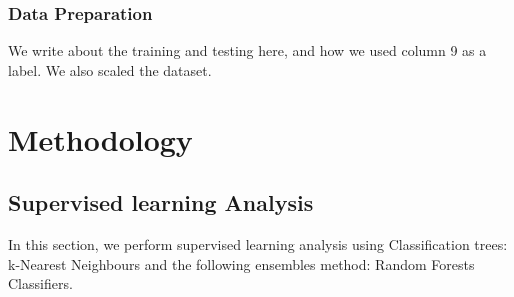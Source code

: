 \documentclass[12pt]{article}
\begin{document}
\begin{enumerate}
		
		
		
		
		
	
	
	
		
		
		
		
		
	
	
	
		
		
		
		
		
		
\end{enumerate}
 

\subsubsection{Data Preparation} 

We write about the training and testing here, and how we used column 9 as a label. We also scaled the dataset.\\

\section{Methodology}
\subsection{Supervised learning Analysis} 
 In this section, we perform supervised learning analysis using Classification trees: k-Nearest Neighbours and the following ensembles method: Random Forests Classifiers.\cite{zhou2012ensemble}
 
\end{document}
